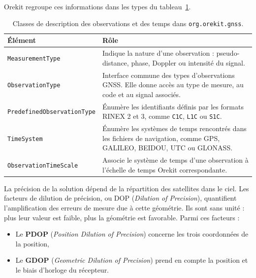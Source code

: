 Orekit regroupe ces informations dans les types du
tableau~\ref{tab:orekit_gnss_observations}.

\begin{table}[htbp]
\centering
\small
\begin{tabularx}{\textwidth}{|>{\raggedright\arraybackslash}p{}|
                                  >{\raggedright\arraybackslash}X|}
\hline
\textbf{Élément} & \textbf{Rôle} \\
\hline
\texttt{MeasurementType} & Indique la nature d'une observation :
pseudo-distance, phase, Doppler ou intensité du signal. \\
\hline
\texttt{ObservationType} & Interface commune des types d'observations GNSS.
Elle donne accès au type de mesure, au code et au signal associés. \\
\hline
\texttt{PredefinedObservationType} & Énumère les identifiants définis par les
formats RINEX 2 et 3, comme \texttt{C1C}, \texttt{L1C} ou \texttt{S1C}. \\
\hline
\texttt{TimeSystem} & Énumère les systèmes de temps rencontrés dans les
fichiers de navigation, comme GPS, GALILEO, BEIDOU, UTC ou GLONASS. \\
\hline
\texttt{ObservationTimeScale} & Associe le système de temps d'une observation
à l'échelle de temps Orekit correspondante. \\
\hline
\end{tabularx}
\caption{Classes de description des observations et des temps dans
\texttt{org.orekit.gnss}.}
\label{tab:orekit_gnss_observations}
\end{table}

La précision de la solution dépend de la répartition des satellites
dans le ciel. Les facteurs de dilution de précision, ou DOP
(\emph{Dilution of Precision}), quantifient l'amplification des erreurs de
mesure due à cette géométrie. Ils sont sans unité : plus leur valeur est
faible, plus la géométrie est favorable. Parmi ces facteurs :

\begin{itemize}
    \item Le \textbf{PDOP} (\emph{Position Dilution of Precision}) concerne les
    trois coordonnées de la position,
    \item Le \textbf{GDOP} (\emph{Geometric Dilution of Precision}) prend en
    compte la position et le biais d'horloge du récepteur.
\end{itemize}


